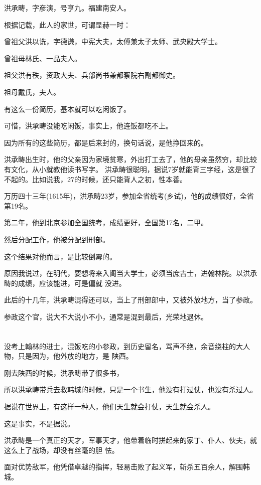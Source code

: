 \documentclass[11pt,a4paper,onecolumn]{article}
\begin{document}
洪承畴，字彦演，号亨九。福建南安人。

根据记载，此人的家世，可谓显赫一时：

曾祖父洪以诜，字德谦，中宪大夫，太傅兼太子太师、武央殿大学士。

曾祖母林氏、一品夫人。

祖父洪有秩，资政大夫、兵部尚书兼都察院右副都御史。

祖母戴氏，夫人。

有这么一份简历，基本就可以吃闲饭了。

可惜，洪承畴没能吃闲饭，事实上，他连饭都吃不上。

因为所有的这些简历，都是后来封的，换句话说，是他挣回来的。

洪承畴出生时，他的父亲因为家境贫寒，外出打工去了，他的母亲虽然穷，却比较有文化，从小就教他读书写字。
洪承畴很聪明，据说7岁就能背三字经，这是很了不起的。比如说我，27的时候，还只能背人之初，性本善。

万历四十三年(1615年)，洪承畴23岁，参加全省统考(乡试)，他的成绩很好，全省第19名。

第二年，他到北京参加全国统考，成绩更好，全国第17名，二甲。

然后分配工作，他被分配到刑部。

这个结果对他而言，是比较倒霉的。

原因我说过，在明代，要想将来入阁当大学士，必须当庶吉士，进翰林院。以洪承畴的成绩，应该能进，可是偏就
没进。

此后的十几年，洪承畴混得还可以，当上了刑部郎中，又被外放地方，当了参政。

参政这个官，说大不大说小不小，通常是混到最后，光荣地退休。

\section[\thesection]{}

没考上翰林的进士，混饭吃的小参政，到历史留名，骂声不绝，余音绕柱的大人物，只是因为，他外放的地方，是
陕西。

刚去陕西的时候，洪承畴带了很多书，

所以洪承畴带兵去救韩城的时候，只是一个书生，他没有打过仗，也没有杀过人。

据说在世界上，有这样一种人，他们天生就会打仗，天生就会杀人。

这是事实，不是据说。

洪承畴是一个真正的天才，军事天才，他带着临时拼起来的家丁、仆人、伙夫，就这么上了战场，却没有丝毫的胆
怯。

面对优势敌军，他凭借卓越的指挥，轻易击败了起义军，斩杀五百余人，解围韩城。
\end{document}
